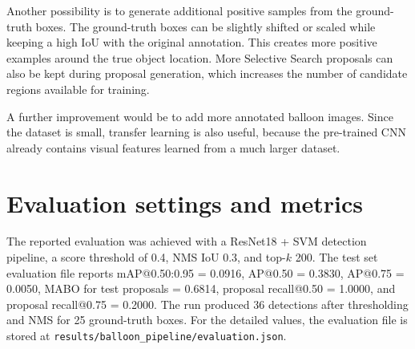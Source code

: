 \documentclass[11pt,a4paper]{article}
\begin{document}
Another possibility is to generate additional positive samples from the ground-truth boxes. The ground-truth boxes can be slightly shifted or scaled while keeping a high IoU with the original annotation. This creates more positive examples around the true object location. More Selective Search proposals can also be kept during proposal generation, which increases the number of candidate regions available for training.

A further improvement would be to add more annotated balloon images. Since the dataset is small, transfer learning is also useful, because the pre-trained CNN already contains visual features learned from a much larger dataset.

\section*{Evaluation settings and metrics}

The reported evaluation was achieved with a ResNet18 + SVM detection pipeline, a score threshold of 0.4, NMS IoU 0.3, and top-$k$ 200. The test set evaluation file reports mAP@0.50:0.95 = 0.0916, AP@0.50 = 0.3830, AP@0.75 = 0.0050, MABO for test proposals = 0.6814, proposal recall@0.50 = 1.0000, and proposal recall@0.75 = 0.2000. The run produced 36 detections after thresholding and NMS for 25 ground-truth boxes. For the detailed values, the evaluation file is stored at \texttt{results/balloon\_pipeline/evaluation.json}.
\end{document}
